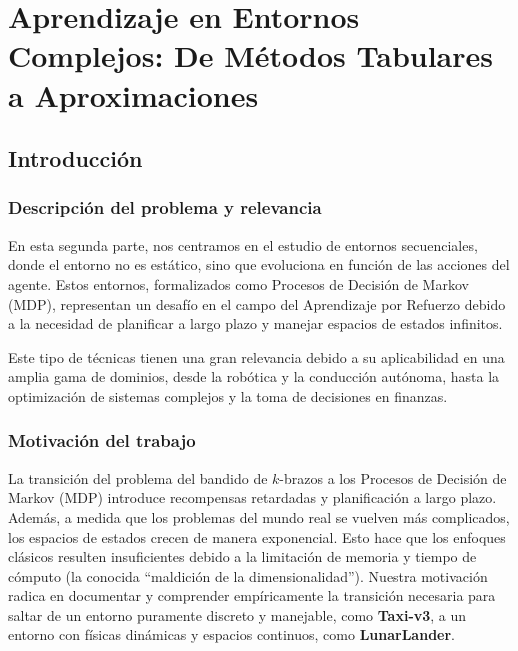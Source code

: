 \chapter{Aprendizaje en Entornos Complejos: De Métodos Tabulares a Aproximaciones}

\section{Introducción}

\subsection{Descripción del problema y relevancia}
En esta segunda parte, nos centramos en el estudio de entornos secuenciales, 
donde el entorno no es estático, sino que evoluciona en función de las acciones del agente. 
Estos entornos, formalizados como Procesos de Decisión de Markov (MDP), representan un desafío
en el campo del Aprendizaje por Refuerzo debido a la necesidad de planificar a largo 
plazo y manejar espacios de estados infinitos.

Este tipo de técnicas tienen una gran relevancia debido a su aplicabilidad
en una amplia gama de dominios, desde la robótica y la conducción autónoma,
hasta la optimización de sistemas complejos y la toma de decisiones en finanzas.

\subsection{Motivación del trabajo}
La transición del problema del bandido de $k$-brazos a los Procesos de Decisión de Markov (MDP) 
introduce recompensas retardadas y planificación a largo plazo. 
Además, a medida que los problemas del mundo real se vuelven más complicados, 
los espacios de estados crecen de manera exponencial. 
Esto hace que los enfoques clásicos resulten insuficientes debido a la limitación de 
memoria y tiempo de cómputo (la conocida ``maldición de la dimensionalidad''). 
Nuestra motivación radica en documentar y comprender empíricamente la transición
 necesaria para saltar de un entorno puramente discreto y manejable, 
 como \textbf{Taxi-v3}, a un entorno con físicas dinámicas y espacios continuos, 
 como \textbf{LunarLander}.

